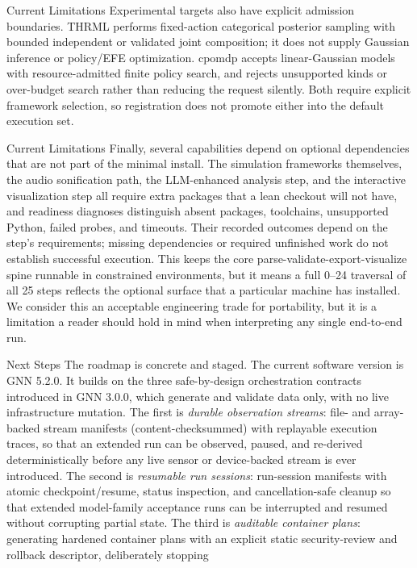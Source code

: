 \documentclass[
  ignorenonframetext,
]{beamer}
\begin{document}
\begin{frame}{Current Limitations}
Experimental targets also have explicit admission boundaries. THRML
performs fixed-action categorical posterior sampling with bounded
independent or validated joint composition; it does not supply Gaussian
inference or policy/EFE optimization. cpomdp accepts linear-Gaussian
models with resource-admitted finite policy search, and rejects
unsupported kinds or over-budget search rather than reducing the request
silently. Both require explicit framework selection, so registration
does not promote either into the default execution set.

\end{frame}

\begin{frame}{Current Limitations}
Finally, several capabilities depend on optional dependencies that are
not part of the minimal install. The simulation frameworks themselves,
the audio sonification path, the LLM-enhanced analysis step, and the
interactive visualization step all require extra packages that a lean
checkout will not have, and readiness diagnoses distinguish absent
packages, toolchains, unsupported Python, failed probes, and timeouts.
Their recorded outcomes depend on the step's requirements; missing
dependencies or required unfinished work do not establish successful
execution. This keeps the core parse-validate-export-visualize spine
runnable in constrained environments, but it means a full 0--24
traversal of all 25 steps reflects the optional surface that a
particular machine has installed. We consider this an acceptable
engineering trade for portability, but it is a limitation a reader
should hold in mind when interpreting any single end-to-end run.
\end{frame}

\begin{frame}[allowframebreaks]{Next Steps}
\protect{}\label{next-steps}
The roadmap is concrete and staged. The current software version is GNN
5.2.0. It builds on the three safe-by-design orchestration contracts
introduced in GNN 3.0.0, which generate and validate data only, with no
live infrastructure mutation. The first is \emph{durable observation
streams}: file- and array-backed stream manifests (content-checksummed)
with replayable execution traces, so that an extended run can be
observed, paused, and re-derived deterministically before any live
sensor or device-backed stream is ever introduced. The second is
\emph{resumable run sessions}: run-session manifests with atomic
checkpoint/resume, status inspection, and cancellation-safe cleanup so
that extended model-family acceptance runs can be interrupted and
resumed without corrupting partial state. The third is \emph{auditable
container plans}: generating hardened container plans with an explicit
static security-review and rollback descriptor, deliberately stopping
\end{frame}
\end{document}
